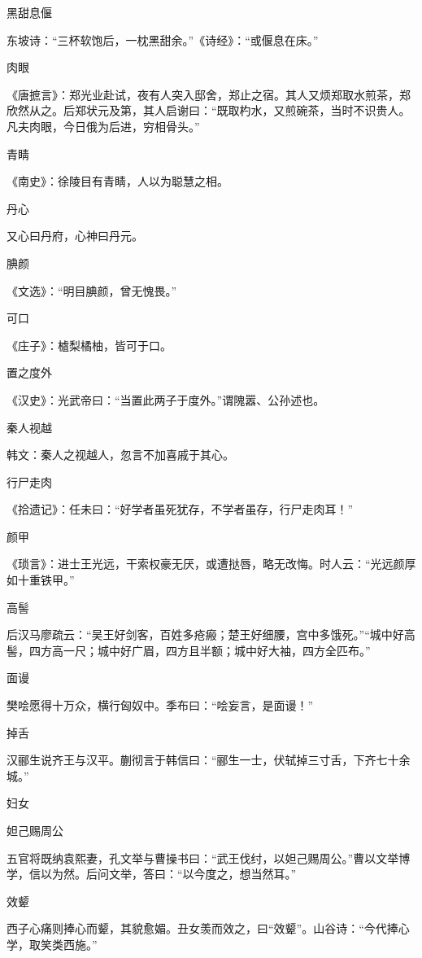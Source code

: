 \documentclass[a4paper,12pt,UTF8,twoside]{ctexbook}
\begin{document}
    黑甜息偃
    
    东坡诗：“三杯软饱后，一枕黑甜余。”《诗经》：“或偃息在床。”
    
    肉眼
    
    《唐摭言》：郑光业赴试，夜有人突入邸舍，郑止之宿。其人又烦郑取水煎茶，郑欣然从之。后郑状元及第，其人启谢曰：“既取杓水，又煎碗茶，当时不识贵人。凡夫肉眼，今日俄为后进，穷相骨头。”
    
    青睛
    
    《南史》：徐陵目有青睛，人以为聪慧之相。
    
    丹心
    
    又心曰丹府，心神曰丹元。
    
    腆颜
    
    《文选》：“明目腆颜，曾无愧畏。”
    
    可口
    
    《庄子》：樝梨橘柚，皆可于口。
    
    置之度外
    
    《汉史》：光武帝曰：“当置此两子于度外。”谓隗嚣、公孙述也。
    
    秦人视越
    
    韩文：秦人之视越人，忽言不加喜戚于其心。
    
    行尸走肉
    
    《拾遗记》：任未曰：“好学者虽死犹存，不学者虽存，行尸走肉耳！”
    
    颜甲
    
    《琐言》：进士王光远，干索权豪无厌，或遭挞唇，略无改悔。时人云：“光远颜厚如十重铁甲。”
    
    高髻
    
    后汉马廖疏云：“吴王好剑客，百姓多疮瘢；楚王好细腰，宫中多饿死。”“城中好高髻，四方高一尺；城中好广眉，四方且半额；城中好大袖，四方全匹布。”
    
    面谩
    
    樊哙愿得十万众，横行匈奴中。季布曰：“哙妄言，是面谩！”
    
    掉舌
    
    汉郦生说齐王与汉平。蒯彻言于韩信曰：“郦生一士，伏轼掉三寸舌，下齐七十余城。”
    
    妇女
    
    妲己赐周公
    
    五官将既纳袁熙妻，孔文举与曹操书曰：“武王伐纣，以妲己赐周公。”曹以文举博学，信以为然。后问文举，答曰：“以今度之，想当然耳。”
    
    效颦
    
    西子心痛则捧心而颦，其貌愈媚。丑女羡而效之，曰“效颦”。山谷诗：“今代捧心学，取笑类西施。”
    
\end{document}
